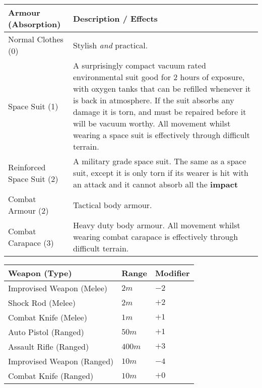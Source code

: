 \documentclass[11pt]{article}
\begin{document}
\begin{multicols}{3}
  \begin{tabularx}{\linewidth}{lX}
    Armour (Absorption) & Description / Effects \\
    \hline
    Normal Clothes (0) & Stylish \textit{and} practical. \\
    Space Suit (1) & A surprisingly compact vacuum rated environmental suit good for $2$ hours of exposure, with oxygen tanks that can be refilled whenever it is back in atmosphere. If the suit absorbs any damage it is torn, and must be repaired before it will be vacuum worthy. All movement whilst wearing a space suit is effectively through difficult terrain. \\
    Reinforced Space Suit (2) & A military grade space suit. The same as a space suit, except it is only torn if its wearer is hit with an attack and it cannot absorb all the \textbf{impact} \\
    Combat Armour (2) & Tactical body armour. \\
    Combat Carapace (3) & Heavy duty body armour. All movement whilst wearing combat carapace is effectively through difficult terrain.
  \end{tabularx}

  \begin{tabularx}{\linewidth}{lXX}
    Weapon (Type) & Range & Modifier \\
    \hline
    Improvised Weapon (Melee) & $2m$ & $-2$ \\
    Shock Rod (Melee) & $2m$ & $+2$ \\
    Combat Knife (Melee) & $1m$ & $+1$ \\
    Auto Pistol (Ranged) & $50m$ & $+1$ \\
    Assault Rifle (Ranged) & $400m$ & $+3$ \\
    Improvised Weapon (Ranged) & $10m$ & $-4$ \\
    Combat Knife (Ranged) & $10m$ & $+0$
  \end{tabularx}


\end{multicols}
\end{document}
